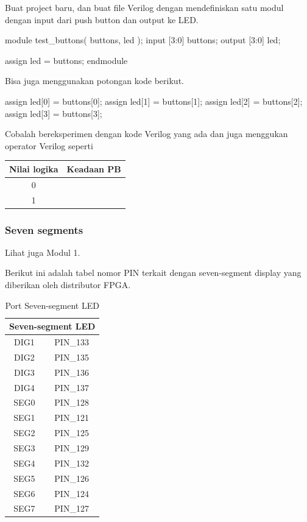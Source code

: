 \documentclass[a4paper,12pt,bahasa]{extarticle}
\begin{document}
Buat project baru, dan buat file Verilog dengan mendefiniskan satu modul
dengan input dari push button dan output ke LED.
\begin{verilogcode}
module test_buttons( buttons, led );
  input  [3:0] buttons;
  output [3:0] led;

  assign led = buttons;
endmodule
\end{verilogcode}

Bisa juga menggunakan potongan kode berikut.
\begin{verilogcode}
  assign led[0] = buttons[0];
  assign led[1] = buttons[1];
  assign led[2] = buttons[2];
  assign led[3] = buttons[3];
\end{verilogcode}

Cobalah bereksperimen dengan kode Verilog yang ada dan juga menggukan operator Verilog
seperti 

\begin{table}[H]
\centering
\begin{tabular}{|c|c|}
\hline
Nilai logika & Keadaan PB \\
\hline
0 & \\
1 & \\
\hline
\end{tabular}
\par
\end{table}

\subsubsection{Seven segments}

Lihat juga Modul 1.

Berikut ini adalah tabel nomor PIN terkait dengan seven-segment display
yang diberikan oleh distributor FPGA.

\begin{table}[H]
\caption{Port Seven-segment LED}\label{tab:pin_sseg}
\centering
\begin{tabular}{|c|c|}
\hline 
\multicolumn{2}{|c|}{Seven-segment LED} \\
\hline 
DIG1 & PIN\_133 \\
\hline 
DIG2 & PIN\_135 \\
\hline 
DIG3 & PIN\_136 \\
\hline 
DIG4 & PIN\_137 \\
\hline 
SEG0 & PIN\_128 \\
\hline 
SEG1 & PIN\_121 \\
\hline 
SEG2 & PIN\_125 \\
\hline
SEG3 & PIN\_129 \\
\hline
SEG4 & PIN\_132 \\
\hline
SEG5 & PIN\_126 \\
\hline
SEG6 & PIN\_124 \\
\hline
SEG7 & PIN\_127 \\
\hline 
\end{tabular}
\par
\end{table}
\end{document}
